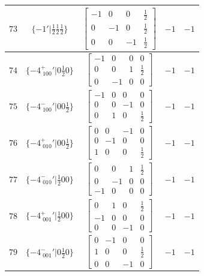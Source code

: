 \documentclass[fleqn,8pt]{jsarticle}
\begin{document}
\begin{longtable}{ccccc}
$ 73 $ & $ \{-1{}'|\frac{1}{2} \frac{1}{2} \frac{1}{2}\} $ & $ \begin{bmatrix} -1 & 0 & 0 & \frac{1}{2} \\ 0 & -1 & 0 & \frac{1}{2} \\ 0 & 0 & -1 & \frac{1}{2} \end{bmatrix} $ & $ -1 $ & $ -1 $ \\ \hline
$ 74 $ & $ \{-4^{+}_{\,\,100}{}'|0 \frac{1}{2} 0\} $ & $ \begin{bmatrix} -1 & 0 & 0 & 0 \\ 0 & 0 & 1 & \frac{1}{2} \\ 0 & -1 & 0 & 0 \end{bmatrix} $ & $ -1 $ & $ -1 $ \\ \hline
$ 75 $ & $ \{-4^{-}_{\,\,100}{}'|0 0 \frac{1}{2}\} $ & $ \begin{bmatrix} -1 & 0 & 0 & 0 \\ 0 & 0 & -1 & 0 \\ 0 & 1 & 0 & \frac{1}{2} \end{bmatrix} $ & $ -1 $ & $ -1 $ \\ \hline
$ 76 $ & $ \{-4^{+}_{\,\,010}{}'|0 0 \frac{1}{2}\} $ & $ \begin{bmatrix} 0 & 0 & -1 & 0 \\ 0 & -1 & 0 & 0 \\ 1 & 0 & 0 & \frac{1}{2} \end{bmatrix} $ & $ -1 $ & $ -1 $ \\ \hline
$ 77 $ & $ \{-4^{-}_{\,\,010}{}'|\frac{1}{2} 0 0\} $ & $ \begin{bmatrix} 0 & 0 & 1 & \frac{1}{2} \\ 0 & -1 & 0 & 0 \\ -1 & 0 & 0 & 0 \end{bmatrix} $ & $ -1 $ & $ -1 $ \\ \hline
$ 78 $ & $ \{-4^{+}_{\,\,001}{}'|\frac{1}{2} 0 0\} $ & $ \begin{bmatrix} 0 & 1 & 0 & \frac{1}{2} \\ -1 & 0 & 0 & 0 \\ 0 & 0 & -1 & 0 \end{bmatrix} $ & $ -1 $ & $ -1 $ \\ \hline
$ 79 $ & $ \{-4^{-}_{\,\,001}{}'|0 \frac{1}{2} 0\} $ & $ \begin{bmatrix} 0 & -1 & 0 & 0 \\ 1 & 0 & 0 & \frac{1}{2} \\ 0 & 0 & -1 & 0 \end{bmatrix} $ & $ -1 $ & $ -1 $ \\ \hline

\end{longtable}
\end{document}
